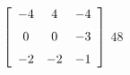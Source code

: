 {$\left[ \begin {array}{ccc} -4&4&-4\\\noalign{\medskip}0&0&-3
\\\noalign{\medskip}-2&-2&-1\end {array} \right] $} 
{$48$}



  

